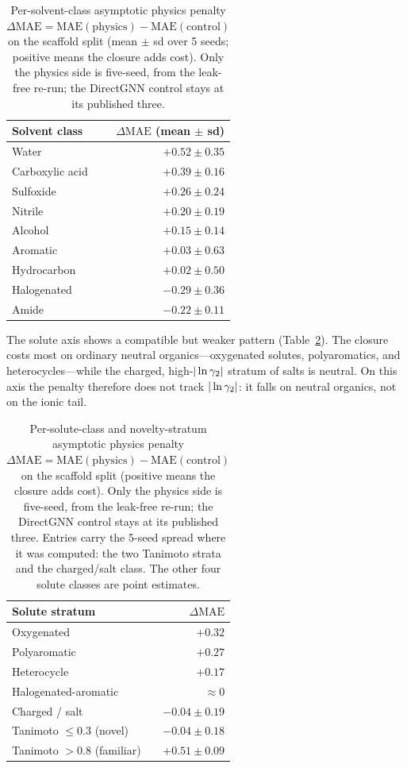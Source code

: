 \begin{table}[t]
\centering
\caption[The asymptotic physics penalty per solvent class]{Per-solvent-class asymptotic physics penalty
$\Delta\mathrm{MAE}=\mathrm{MAE(physics)}-\mathrm{MAE(control)}$ on the scaffold
split (mean $\pm$ sd over 5 seeds; positive means the closure adds cost). Only the physics side
is five-seed, from the leak-free re-run; the DirectGNN control stays at its published three.}
\label{tab:solvent-map}
\begin{tabular}{lr}
\toprule
Solvent class & $\Delta\mathrm{MAE}$ (mean $\pm$ sd) \\
\midrule
Water & $+0.52 \pm 0.35$ \\
Carboxylic acid & $+0.39 \pm 0.16$ \\
Sulfoxide & $+0.26 \pm 0.24$ \\
Nitrile & $+0.20 \pm 0.19$ \\
Alcohol & $+0.15 \pm 0.14$ \\
Aromatic & $+0.03 \pm 0.63$ \\
Hydrocarbon & $+0.02 \pm 0.50$ \\
Halogenated & $-0.29 \pm 0.36$ \\
Amide & $-0.22 \pm 0.11$ \\
\bottomrule
\end{tabular}
\end{table}

The solute axis shows a compatible but weaker pattern (Table~\ref{tab:solute-map}). The closure costs most on ordinary neutral organics---oxygenated solutes, polyaromatics, and heterocycles---while the charged, high-$|\ln\gamma_2|$ stratum of salts is neutral. On this axis the penalty therefore does not track $|\ln\gamma_2|$: it falls on neutral organics, not on the ionic tail.

\begin{table}[t]
\centering
\caption[The asymptotic physics penalty per solute class and novelty stratum]{Per-solute-class and novelty-stratum asymptotic physics penalty
$\Delta\mathrm{MAE}=\mathrm{MAE(physics)}-\mathrm{MAE(control)}$ on the scaffold split
(positive means the closure adds cost). Only the physics side is five-seed, from the leak-free
re-run; the DirectGNN control stays at its published three. Entries carry the 5-seed spread where it was computed:
the two Tanimoto strata and the charged/salt class. The other four solute classes are point
estimates.}
\label{tab:solute-map}
\begin{tabular}{lr}
\toprule
Solute stratum & $\Delta\mathrm{MAE}$ \\
\midrule
Oxygenated            & $+0.32$ \\
Polyaromatic          & $+0.27$ \\
Heterocycle           & $+0.17$ \\
Halogenated-aromatic  & $\approx0$ \\
Charged / salt        & $-0.04 \pm 0.19$ \\
\midrule
Tanimoto $\leq0.3$ (novel)    & $-0.04 \pm 0.18$ \\
Tanimoto $>0.8$ (familiar)    & $+0.51 \pm 0.09$ \\
\bottomrule
\end{tabular}
\end{table}

